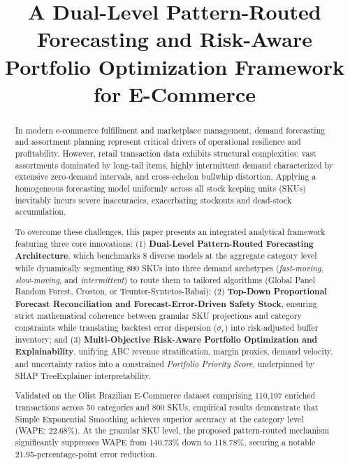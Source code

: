 \documentclass[conference]{IEEEtran}
\begin{document}
\title{A Dual-Level Pattern-Routed Forecasting and Risk-Aware Portfolio Optimization Framework for E-Commerce}

\author{
}

\maketitle

\begin{abstract}
In modern e-commerce fulfillment and marketplace management, demand forecasting and assortment planning represent critical drivers of operational resilience and profitability. However, retail transaction data exhibits structural complexities: vast assortments dominated by long-tail items, highly intermittent demand characterized by extensive zero-demand intervals, and cross-echelon bullwhip distortion. Applying a homogeneous forecasting model uniformly across all stock keeping units (SKUs) inevitably incurs severe inaccuracies, exacerbating stockouts and dead-stock accumulation. 

To overcome these challenges, this paper presents an integrated analytical framework featuring three core innovations: (1) \textbf{Dual-Level Pattern-Routed Forecasting Architecture}, which benchmarks 8 diverse models at the aggregate category level while dynamically segmenting 800 SKUs into three demand archetypes (\textit{fast-moving}, \textit{slow-moving}, and \textit{intermittent}) to route them to tailored algorithms (Global Panel Random Forest, Croston, or Teunter-Syntetos-Babai); (2) \textbf{Top-Down Proportional Forecast Reconciliation and Forecast-Error-Driven Safety Stock}, ensuring strict mathematical coherence between granular SKU projections and category constraints while translating backtest error dispersion ($\sigma_e$) into risk-adjusted buffer inventory; and (3) \textbf{Multi-Objective Risk-Aware Portfolio Optimization and Explainability}, unifying ABC revenue stratification, margin proxies, demand velocity, and uncertainty ratios into a constrained \textit{Portfolio Priority Score}, underpinned by SHAP TreeExplainer interpretability. 

Validated on the Olist Brazilian E-Commerce dataset comprising 110,197 enriched transactions across 50 categories and 800 SKUs, empirical results demonstrate that Simple Exponential Smoothing achieves superior accuracy at the category level (WAPE: 22.68\%). At the granular SKU level, the proposed pattern-routed mechanism significantly suppresses WAPE from 140.73\% down to 118.78\%, securing a notable 21.95-percentage-point error reduction.
\end{abstract}
\end{document}
